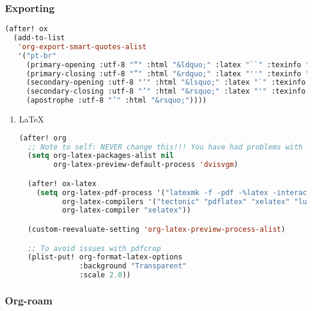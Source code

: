 \documentclass[11pt]{article}
\begin{document}
\subsubsection{Exporting}
\label{sec:exporting}
\begin{lstlisting}[language=Lisp]
(after! ox
  (add-to-list
   'org-export-smart-quotes-alist
   '("pt-br"
     (primary-opening :utf-8 "“" :html "&ldquo;" :latex "``" :texinfo "``")
     (primary-closing :utf-8 "”" :html "&rdquo;" :latex "''" :texinfo "''")
     (secondary-opening :utf-8 "‘" :html "&lsquo;" :latex "`" :texinfo "`")
     (secondary-closing :utf-8 "’" :html "&rsquo;" :latex "'" :texinfo "'")
     (apostrophe :utf-8 "’" :html "&rsquo;"))))
\end{lstlisting}

\begin{enumerate}
  \item LaTeX
  \label{sec:latex-1}

  \begin{lstlisting}[language=Lisp]
(after! org
  ;; Note to self: NEVER change this!!! You have had problems with uncompilable documents when you changed the default preamble in the past!!
  (setq org-latex-packages-alist nil
        org-latex-preview-default-process 'dvisvgm)

  (after! ox-latex
    (setq org-latex-pdf-process '("latexmk -f -pdf -%latex -interaction=nonstopmode -output-directory=%o %f")
          org-latex-compilers '("tectonic" "pdflatex" "xelatex" "lualatex")
          org-latex-compiler "xelatex"))

  (custom-reevaluate-setting 'org-latex-preview-process-alist)

  ;; To avoid issues with pdfcrop
  (plist-put! org-format-latex-options
              :background "Transparent"
              :scale 2.0))
\end{lstlisting}
\end{enumerate}

\subsubsection{Org-roam}
\label{sec:org-roam}
\end{document}

